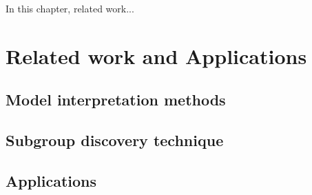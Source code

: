 In this chapter, related work... \cite{eli5}

\section{Related work and Applications}


\subsection{Model interpretation methods}


\subsection{Subgroup discovery technique}


\subsection{Applications}






